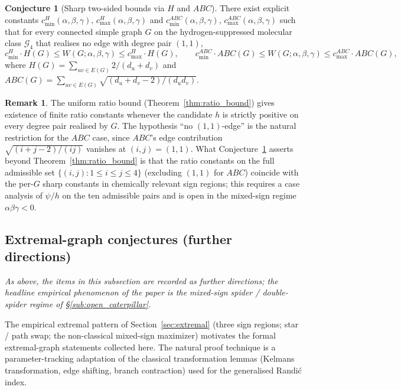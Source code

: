 \documentclass[11pt,a4paper]{article}
\theoremstyle{definition}
\newtheorem{conjecture}[theorem]{Conjecture}
\newtheorem{remark}[theorem]{Remark}
\newcommand{\Wuzi}{W(G;\alpha,\beta,\gamma)}
\begin{document}
\begin{conjecture}[Sharp two-sided bounds via $H$ and $ABC$]\label{conj:H_ABC}
There exist explicit constants
$c^{H}_{\min}(\alpha,\beta,\gamma),\, c^{H}_{\max}(\alpha,\beta,\gamma)$
and
$c^{ABC}_{\min}(\alpha,\beta,\gamma),\, c^{ABC}_{\max}(\alpha,\beta,\gamma)$
such that for every connected simple graph $G$ on the
hydrogen-suppressed molecular class $\mathcal{G}_4$ that realises
no edge with degree pair $(1, 1)$,
\[
c^{H}_{\min}\cdot H(G) \le \Wuzi \le c^{H}_{\max}\cdot H(G),
\qquad
c^{ABC}_{\min}\cdot ABC(G) \le \Wuzi \le c^{ABC}_{\max}\cdot ABC(G),
\]
where $H(G) = \sum_{uv \in E(G)} 2/(d_u + d_v)$ and
$ABC(G) = \sum_{uv \in E(G)} \sqrt{(d_u + d_v - 2)/(d_u d_v)}$.
\end{conjecture}

\begin{remark}\label{rem:H_ABC_strategy}
The uniform ratio bound (Theorem~\ref{thm:ratio_bound}) gives
existence of finite ratio constants whenever the candidate $h$ is
strictly positive on every degree pair realised by $G$. The
hypothesis ``no $(1, 1)$-edge'' is the natural restriction for the
$ABC$ case, since $ABC$'s edge contribution $\sqrt{(i+j-2)/(ij)}$
vanishes at $(i, j) = (1, 1)$. What Conjecture~\ref{conj:H_ABC}
asserts beyond Theorem~\ref{thm:ratio_bound} is that the ratio
constants on the full admissible set $\{(i, j) : 1 \le i \le j \le 4\}$
(excluding $(1, 1)$ for $ABC$) coincide with the per-$G$ sharp
constants in chemically relevant sign regions; this requires a
case analysis of $\psi/h$ on the ten admissible pairs and is open
in the mixed-sign regime $\alpha\beta\gamma < 0$.
\end{remark}

\subsection{Extremal-graph conjectures (further directions)}\label{sub:open_extremal}

\noindent\emph{As above, the items in this subsection are recorded
as further directions; the headline empirical phenomenon of the
paper is the mixed-sign spider / double-spider regime of
\S\ref{sub:open_caterpillar}.}

The empirical extremal pattern of Section~\ref{sec:extremal} (three
sign regions; star / path swap; the non-classical mixed-sign
maximizer) motivates the formal extremal-graph statements collected
here. The natural proof technique is a parameter-tracking
adaptation of the classical transformation lemmas (Kelmans
transformation, edge shifting, branch contraction) used for the
generalised Randi\'c index.
\end{document}
